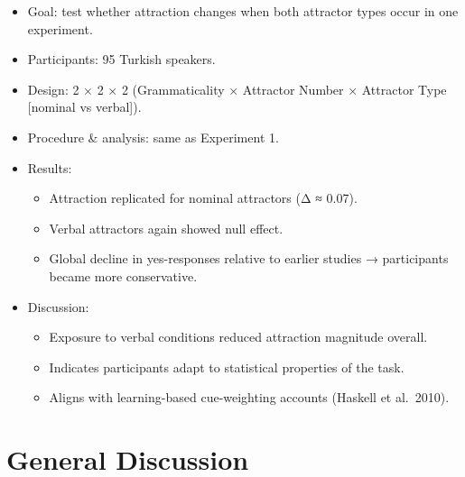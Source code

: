 \documentclass[
  authoryear,
  3p]{elsarticle}
\providecommand{\tightlist}{%
  \setlength{\itemsep}{0pt}\setlength{\parskip}{0pt}}
\begin{document}
\begin{itemize}
\tightlist
\item
  Goal: test whether attraction changes when both attractor types occur
  in one experiment.
\item
  Participants: 95 Turkish speakers.
\item
  Design: 2 × 2 × 2 (Grammaticality × Attractor Number × Attractor Type
  {[}nominal vs verbal{]}).
\item
  Procedure \& analysis: same as Experiment 1.
\item
  Results:

  \begin{itemize}
  \tightlist
  \item
    Attraction replicated for nominal attractors (Δ ≈ 0.07).
  \item
    Verbal attractors again showed null effect.
  \item
    Global decline in yes-responses relative to earlier studies →
    participants became more conservative.
  \end{itemize}
\item
  Discussion:

  \begin{itemize}
  \tightlist
  \item
    Exposure to verbal conditions reduced attraction magnitude overall.
  \item
    Indicates participants adapt to statistical properties of the task.
  \item
    Aligns with learning-based cue-weighting accounts (Haskell et
    al.~2010).
  \end{itemize}
\end{itemize}

\section{General Discussion}\label{general-discussion}
\end{document}

